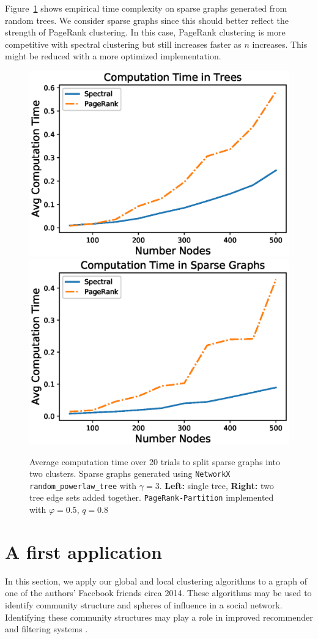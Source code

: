 \documentclass[11pt]{article}
\begin{document}
Figure~\ref{fig:compute_time_sparse} shows empirical time complexity on sparse graphs generated from random trees. We consider sparse graphs since this should better reflect the strength of PageRank clustering. In this case, PageRank clustering is more competitive with spectral clustering but still increases faster as $n$ increases. This might be reduced with a more optimized implementation.
\begin{figure}
\includegraphics[width=.5\textwidth]{trees_compute_time.eps}
\includegraphics[width=.5\textwidth]{trees2_compute_time.eps}
\caption{Average computation time over 20 trials to split sparse graphs into two clusters. Sparse graphs generated using {\tt NetworkX} {\tt random\_powerlaw\_tree} with $\gamma = 3$. \textbf{Left:} single tree, \textbf{Right:} two tree edge sets added together. {\tt PageRank-Partition} implemented with $\varphi  =  0.5$, $q = 0.8$} \label{fig:compute_time_sparse}
\end{figure}







\section{A first application}
\label{Applications}

In this section, we apply our global and local clustering algorithms to a graph of one of the authors' Facebook friends circa 2014. These algorithms may be used to identify community structure and spheres of influence in a social network. Identifying these community structures may play a role in improved recommender and filtering systems \cite{}.
\end{document}
